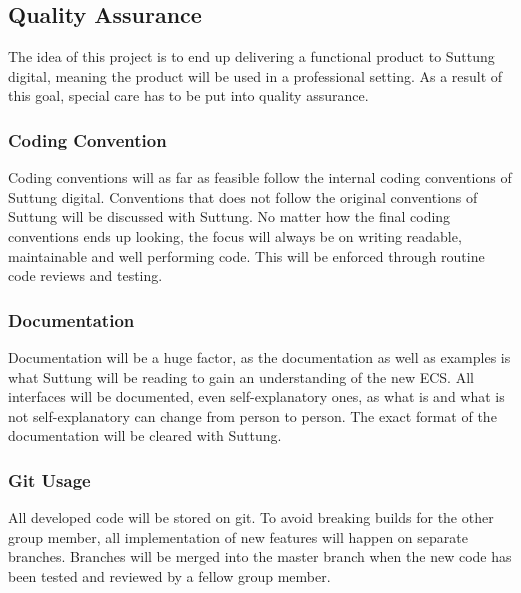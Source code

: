 \subsection*{Quality Assurance}
The idea of this project is to end up delivering a functional product to Suttung digital,
meaning the product will be used in a professional setting.
As a result of this goal, special care has to be put into quality assurance.

\subsubsection*{Coding Convention}
Coding conventions will as far as feasible follow the internal coding conventions of Suttung digital.
Conventions that does not follow the original conventions of Suttung will be discussed with Suttung.
No matter how the final coding conventions ends up looking, the focus will always be on writing
readable, maintainable and well performing code.
This will be enforced through routine code reviews and testing.

\subsubsection*{Documentation}
Documentation will be a huge factor, as the documentation as well as examples is what 
Suttung will be reading to gain an understanding of the new ECS. 
All interfaces will be documented, even self-explanatory ones, as what is and what is not
self-explanatory can change from person to person.
The exact format of the documentation will be cleared with Suttung.

\subsubsection*{Git Usage}
All developed code will be stored on git. 
To avoid breaking builds for the other group member,
all implementation of new features will happen on separate branches.
Branches will be merged into the master branch when the new code has been tested and reviewed 
by a fellow group member.